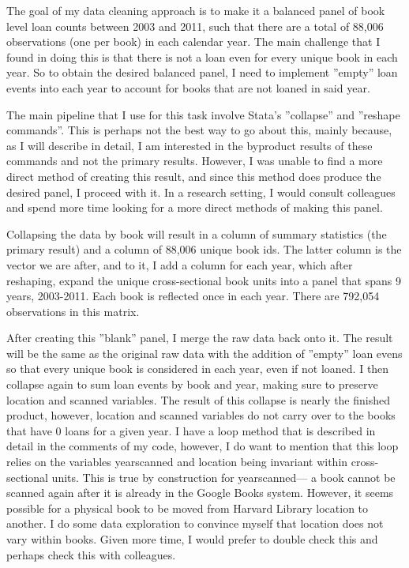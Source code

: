 \documentclass{article}
\begin{document}
The goal of my data cleaning approach is to make it a balanced panel of book level loan counts between 2003 and 2011, such that there are a total of 88,006 observations (one per book) in each calendar year.
The main challenge that I found in doing this is that there is not a loan even for every unique book in each year. So to obtain the desired balanced panel, I need to implement ”empty” loan events into each year to account for books that are not loaned in said year.

The main pipeline that I use for this task involve Stata’s ”collapse” and ”reshape commands”. This is perhaps not the best way to go about this, mainly because, as I will describe in detail, I am interested in the byproduct results of these commands and not the primary results. However, I was unable to find a more direct method of creating this result, and since this method does produce the desired panel, I proceed with it. In a research setting, I would consult colleagues and spend more time looking for a more direct methods of making this panel.

Collapsing the data by book will result in a column of summary statistics (the primary result) and a column of 88,006 unique book ids. The latter column is the vector we are after, and to it, I add a column for each year, which after reshaping, expand the unique cross-sectional book units into a panel that spans 9 years, 2003-2011. Each book is reflected once in each year. There are 792,054 observations in this matrix.

After creating this ”blank” panel, I merge the raw data back onto it. The result will be the same as the original raw data with the addition of ”empty” loan evens so that every unique book is considered in each year, even if not loaned. I then collapse again to sum loan events by book and year, making sure to preserve location and scanned variables. The result of this collapse is nearly the finished product, however, location and scanned variables do not carry over to the books that have 0 loans for a given year. I have a loop method that is described in detail in the comments of my code, however, I do want to mention that this loop relies on the variables yearscanned and location being invariant within cross-sectional units. This is true by construction for yearscanned— a book cannot be scanned again after it is already in the Google Books system. However, it seems possible for a physical book to be moved from Harvard Library location to another. I do some data exploration to convince myself that location does not vary within books. Given more time, I would prefer to double check this and perhaps check this with colleagues.
\end{document}
